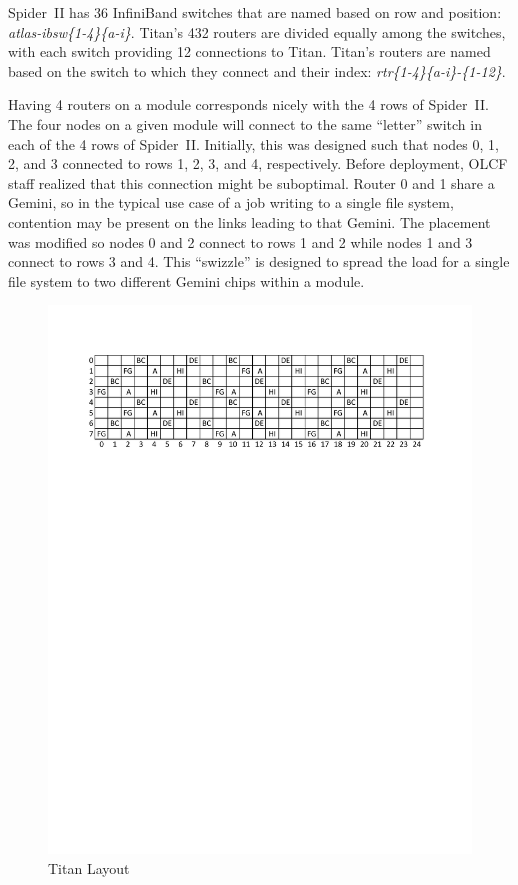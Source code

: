 Spider~II has 36 InfiniBand switches that are named based on row and position:
\textit{atlas-ibsw\{1-4\}\{a-i\}}.  Titan's 432 routers are divided equally
among the switches, with each switch providing 12 connections to Titan.
Titan's routers are named based on the switch to which they connect and their
index: \textit{rtr\{1-4\}\{a-i\}-\{1-12\}}.

Having 4 routers on a module corresponds nicely with the 4 rows of Spider~II.
The  four nodes on a given module will connect to the same ``letter'' switch in
each of the 4 rows of Spider~II.  Initially, this was designed such that nodes
0, 1, 2, and 3 connected to rows 1, 2, 3, and 4, respectively.  Before
deployment, OLCF staff realized that this connection might be suboptimal.
Router 0 and 1 share a Gemini, so in the typical use case of a job writing to a
single file system, contention may be present on the links leading to that
Gemini.  The placement was modified so nodes 0 and 2 connect to rows 1 and 2
while nodes 1 and 3 connect to rows 3 and 4.  This ``swizzle'' is designed to
spread the load for a single file system to two different Gemini chips within a
module.

\begin{figure}[t]
  \begin{center}
    \includegraphics{figures/titanplacement}
    \caption{Titan Layout}\label{fig:titanlayout}
  \end{center}
\end{figure}

